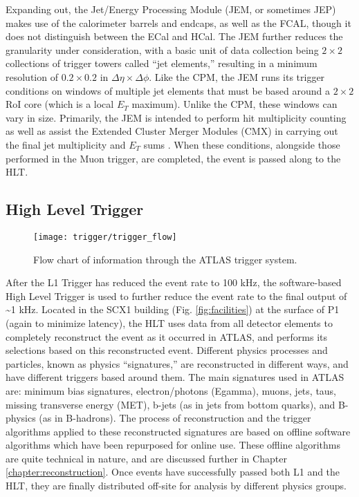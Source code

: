         Expanding out, the Jet/Energy Processing Module (JEM, or sometimes JEP) makes use of the calorimeter barrels and endcaps, as well as the FCAL, though it does not distinguish between the ECal and HCal.
        The JEM further reduces the granularity under consideration, with a basic unit of data collection being $2 \times 2$ collections of trigger towers called ``jet elements,'' resulting in a minimum resolution of $0.2 \times 0.2$ in $\Delta \eta \times \Delta \phi$.
        Like the CPM, the JEM runs its trigger conditions on windows of multiple jet elements that must be based around a $2 \times 2$ RoI core (which is a local $E_T$ maximum).
        Unlike the CPM, these windows can vary in size.
        Primarily, the JEM is intended to perform hit multiplicity counting
            as well as assist the Extended Cluster Merger Modules (CMX) in carrying out the final jet multiplicity
            and $E_T$ sums \cite{L1_calo_run1}\cite{trigger_run2}.
        When these conditions, alongside those performed in the Muon trigger, are completed, the event is passed along to the HLT.


\FloatBarrier
    \subsection{High Level Trigger}
        \begin{figure}[h]
            \texttt{[image: trigger/trigger\_flow]}
            \caption{Flow chart of information through the ATLAS trigger system\cite{trigger_run2}.}
            \label{fig:trigger_flow}
        \end{figure}

        After the L1 Trigger has reduced the event rate to 100 kHz, the software-based High Level Trigger is used to further reduce the event rate to the final output of \textasciitilde 1 kHz.
        Located in the SCX1 building (Fig. \ref{fig:facilities}) at the surface of P1 (again to minimize latency), the HLT uses data from all detector elements to completely reconstruct the event as it occurred in ATLAS, and performs its selections based on this reconstructed event.
        Different physics processes and particles, known as physics ``signatures,'' are reconstructed in different ways, and have different triggers based around them. 
        The main signatures used in ATLAS are: minimum bias signatures, electron/photons (Egamma), muons, jets, taus, missing transverse energy (MET), b-jets (as in jets from bottom quarks), and B-physics (as in B-hadrons).
        The process of reconstruction and the trigger algorithms applied to these reconstructed signatures are based on offline software algorithms which have been repurposed for online use.
        These offline algorithms are quite technical in nature, and are discussed further in Chapter \ref{chapter:reconstruction}.
        Once events have successfully passed both L1 and the HLT, they are finally distributed off-site for analysis by different physics groups.

